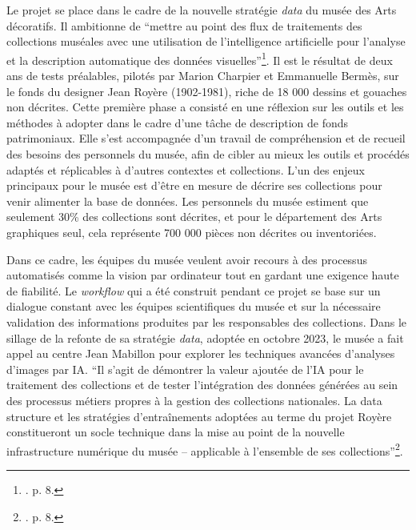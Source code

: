 \documentclass[12pt,twoside]{book}
\begin{document}
Le projet se place dans le cadre de la nouvelle stratégie \textit{data} du musée des Arts décoratifs. Il ambitionne de \enquote{mettre au point des flux de traitements des collections muséales avec une utilisation de l'intelligence artificielle pour l'analyse et la description automatique des données visuelles}\footnote{\cite{grim_vision_2024}. p. 8.}. Il est le résultat de deux ans de tests préalables, pilotés par Marion Charpier et Emmanuelle Bermès, sur le fonds du designer Jean Royère (1902-1981), riche de 18 000 dessins et gouaches non décrites. Cette première phase a consisté en une réflexion sur les outils et les méthodes à adopter dans le cadre d'une tâche de description de fonds patrimoniaux. Elle s'est accompagnée d'un travail de compréhension et de recueil des besoins des personnels du musée, afin de cibler au mieux les outils et procédés adaptés et réplicables à d'autres contextes et collections. L'un des enjeux principaux pour le musée est d'être en mesure de décrire ses collections pour venir alimenter la base de données. Les personnels du musée estiment que seulement 30\% des collections sont décrites, et pour le département des Arts graphiques seul, cela représente 700 000 pièces non décrites ou inventoriées. \hfill \break
\hfill \break

Dans ce cadre, les équipes du musée veulent avoir recours à des processus automatisés comme la vision par ordinateur tout en gardant une exigence haute de fiabilité. Le \textit{workflow} qui a été construit pendant ce projet se base sur un dialogue constant avec les équipes scientifiques du musée et sur la nécessaire validation des informations produites par les responsables des collections. Dans le sillage de la refonte de sa stratégie \textit{data}, adoptée en octobre 2023, le musée a fait appel au centre Jean Mabillon pour explorer les techniques avancées d'analyses d'images par IA. \enquote{Il s’agit de démontrer la valeur ajoutée de l’IA pour le traitement des collections et
de tester l’intégration des données générées au sein des processus métiers propres à la gestion
des collections nationales. La data structure et les stratégies d’entraînements adoptées au
terme du projet Royère constitueront un socle technique dans la mise au point de la nouvelle
infrastructure numérique du musée – applicable à l’ensemble de ses collections}\footnote{\cite{grim_vision_2024}. p. 8.}.
\end{document}
